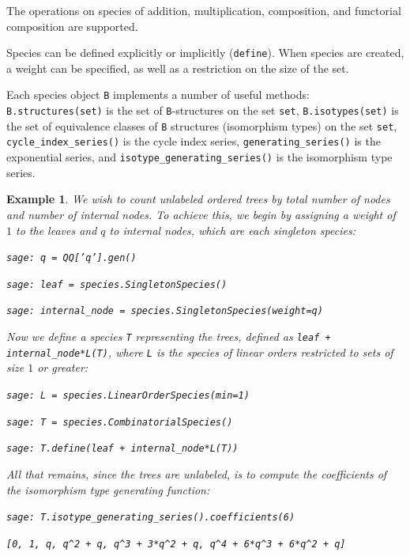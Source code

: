 \documentclass[12pt]{article}
\theoremstyle{plain}
\newtheorem{exa}{Example}
\newcommand{\codefont}[1]{{\fontshape{n}\texttt{#1}}}
\newenvironment{snippet}{\vspace{10px}\fontfamily{ppl}\selectfont}{\vspace{10px}}
\begin{document}
The operations on species of
addition,
multiplication,
composition, and
functorial composition are supported.

Species can be defined explicitly or implicitly (\codefont{define}).
When species are created, a weight can be specified, as well as a restriction on the size of the set.

Each species object \codefont{B} implements a number of useful methods:
\codefont{B.structures(set)} is the set of \codefont{B}-structures on the set \codefont{set},
\codefont{B.isotypes(set)} is the set of equivalence classes of \codefont{B} structures (isomorphism types) on the set \codefont{set},
\codefont{cycle\_index\_series()} is the cycle index series,
\codefont{generating\_series()} is the exponential series, and
\codefont{isotype\_generating\_series()} is the isomorphism type series.

\begin{exa}
We wish to count unlabeled ordered trees by total number of nodes and number of internal nodes.
To achieve this, we begin by assigning a weight of \(1\) to the leaves and \(q\) to internal nodes, which are each singleton species:

\begin{snippet}
\codefont{sage: q = QQ['q'].gen()}

\codefont{sage: leaf = species.SingletonSpecies()}

\codefont{sage: internal\_node = species.SingletonSpecies(weight=q)}
\end{snippet}

Now we define a species \codefont{T} representing the trees, defined as \codefont{leaf + internal\_node*L(T)}, where \codefont{L} is the species of linear orders restricted to sets of size \(1\) or greater:

\begin{snippet}
\codefont{sage: L = species.LinearOrderSpecies(min=1)}

\codefont{sage: T = species.CombinatorialSpecies()}

\codefont{sage: T.define(leaf + internal\_node*L(T))}
\end{snippet}

All that remains, since the trees are unlabeled, is to compute the coefficients of the isomorphism type generating function:

\begin{snippet}
\codefont{sage: T.isotype\_generating\_series().coefficients(6)}

\codefont{[0, 1, q, q\^{}2 + q, q\^{}3 + 3*q\^{}2 + q, q\^{}4 + 6*q\^{}3 + 6*q\^{}2 + q]}
\end{snippet}
\end{exa}
\end{document}
